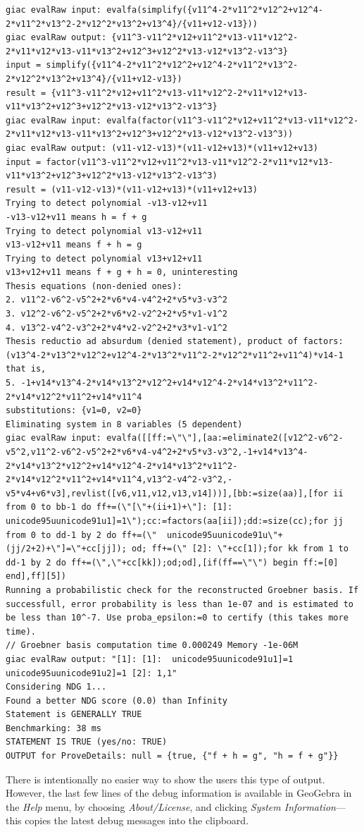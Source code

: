 \documentclass{article}
\begin{document}
{\begin{lstlisting}[language=mylog]
giac evalRaw input: evalfa(simplify({v11^4-2*v11^2*v12^2+v12^4-2*v11^2*v13^2-2*v12^2*v13^2+v13^4}/{v11+v12-v13}))
giac evalRaw output: {v11^3-v11^2*v12+v11^2*v13-v11*v12^2-2*v11*v12*v13-v11*v13^2+v12^3+v12^2*v13-v12*v13^2-v13^3}
input = simplify({v11^4-2*v11^2*v12^2+v12^4-2*v11^2*v13^2-2*v12^2*v13^2+v13^4}/{v11+v12-v13})
result = {v11^3-v11^2*v12+v11^2*v13-v11*v12^2-2*v11*v12*v13-v11*v13^2+v12^3+v12^2*v13-v12*v13^2-v13^3}
giac evalRaw input: evalfa(factor(v11^3-v11^2*v12+v11^2*v13-v11*v12^2-2*v11*v12*v13-v11*v13^2+v12^3+v12^2*v13-v12*v13^2-v13^3))
giac evalRaw output: (v11-v12-v13)*(v11-v12+v13)*(v11+v12+v13)
input = factor(v11^3-v11^2*v12+v11^2*v13-v11*v12^2-2*v11*v12*v13-v11*v13^2+v12^3+v12^2*v13-v12*v13^2-v13^3)
result = (v11-v12-v13)*(v11-v12+v13)*(v11+v12+v13)
Trying to detect polynomial -v13-v12+v11
-v13-v12+v11 means h = f + g
Trying to detect polynomial v13-v12+v11
v13-v12+v11 means f + h = g
Trying to detect polynomial v13+v12+v11
v13+v12+v11 means f + g + h = 0, uninteresting
Thesis equations (non-denied ones):
2. v11^2-v6^2-v5^2+2*v6*v4-v4^2+2*v5*v3-v3^2
3. v12^2-v6^2-v5^2+2*v6*v2-v2^2+2*v5*v1-v1^2
4. v13^2-v4^2-v3^2+2*v4*v2-v2^2+2*v3*v1-v1^2
Thesis reductio ad absurdum (denied statement), product of factors:
(v13^4-2*v13^2*v12^2+v12^4-2*v13^2*v11^2-2*v12^2*v11^2+v11^4)*v14-1
that is,
5. -1+v14*v13^4-2*v14*v13^2*v12^2+v14*v12^4-2*v14*v13^2*v11^2-2*v14*v12^2*v11^2+v14*v11^4
substitutions: {v1=0, v2=0}
Eliminating system in 8 variables (5 dependent)
giac evalRaw input: evalfa([[ff:=\"\"],[aa:=eliminate2([v12^2-v6^2-v5^2,v11^2-v6^2-v5^2+2*v6*v4-v4^2+2*v5*v3-v3^2,-1+v14*v13^4-2*v14*v13^2*v12^2+v14*v12^4-2*v14*v13^2*v11^2-2*v14*v12^2*v11^2+v14*v11^4,v13^2-v4^2-v3^2,-v5*v4+v6*v3],revlist([v6,v11,v12,v13,v14]))],[bb:=size(aa)],[for ii from 0 to bb-1 do ff+=(\"[\"+(ii+1)+\"]: [1]:  unicode95uunicode91u1]=1\");cc:=factors(aa[ii]);dd:=size(cc);for jj from 0 to dd-1 by 2 do ff+=(\"  unicode95uunicode91u\"+(jj/2+2)+\"]=\"+cc[jj]); od; ff+=(\" [2]: \"+cc[1]);for kk from 1 to dd-1 by 2 do ff+=(\",\"+cc[kk]);od;od],[if(ff==\"\") begin ff:=[0] end],ff][5])
Running a probabilistic check for the reconstructed Groebner basis. If successfull, error probability is less than 1e-07 and is estimated to be less than 10^-7. Use proba_epsilon:=0 to certify (this takes more time).
// Groebner basis computation time 0.000249 Memory -1e-06M
giac evalRaw output: "[1]: [1]:  unicode95uunicode91u1]=1  unicode95uunicode91u2]=1 [2]: 1,1"
Considering NDG 1...
Found a better NDG score (0.0) than Infinity
Statement is GENERALLY TRUE
Benchmarking: 38 ms
STATEMENT IS TRUE (yes/no: TRUE)
OUTPUT for ProveDetails: null = {true, {"f + h = g", "h = f + g"}}
\end{lstlisting}
} %
There is intentionally no easier way to show the users this type of output. However, the last few lines of the debug information is available in GeoGebra in the \textit{Help} menu, by choosing \textit{About/License}, and clicking \textit{System Information}---this copies the latest debug messages into the clipboard.


\end{document}
